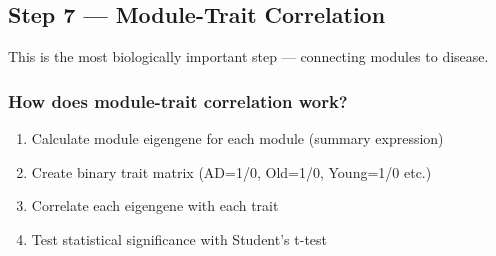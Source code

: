 \documentclass[
]{article}
\providecommand{\tightlist}{%
  \setlength{\itemsep}{0pt}\setlength{\parskip}{0pt}}
\begin{document}
\subsection{Step 7 --- Module-Trait
Correlation}\label{step-7-module-trait-correlation}

This is the most biologically important step --- connecting modules to
disease.

\subsubsection{How does module-trait correlation
work?}\label{how-does-module-trait-correlation-work}

\begin{enumerate}
\def\labelenumi{\arabic{enumi}.}
\tightlist
\item
  Calculate module eigengene for each module (summary expression)
\item
  Create binary trait matrix (AD=1/0, Old=1/0, Young=1/0 etc.)
\item
  Correlate each eigengene with each trait
\item
  Test statistical significance with Student's t-test
\end{enumerate}
\end{document}
